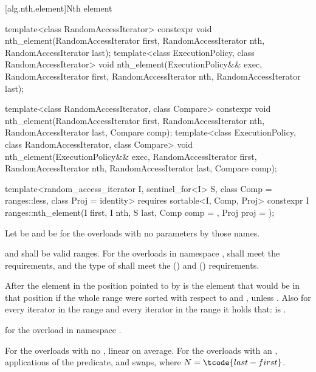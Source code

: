 [alg.nth.element]{Nth element}

%
\begin{itemdecl}
template<class RandomAccessIterator>
  constexpr void nth_element(RandomAccessIterator first, RandomAccessIterator nth,
                             RandomAccessIterator last);
template<class ExecutionPolicy, class RandomAccessIterator>
  void nth_element(ExecutionPolicy&& exec,
                   RandomAccessIterator first, RandomAccessIterator nth,
                   RandomAccessIterator last);

template<class RandomAccessIterator, class Compare>
  constexpr void nth_element(RandomAccessIterator first, RandomAccessIterator nth,
                             RandomAccessIterator last,  Compare comp);
template<class ExecutionPolicy, class RandomAccessIterator, class Compare>
  void nth_element(ExecutionPolicy&& exec,
                   RandomAccessIterator first, RandomAccessIterator nth,
                   RandomAccessIterator last, Compare comp);

template<random_access_iterator I, sentinel_for<I> S, class Comp = ranges::less,
         class Proj = identity>
  requires sortable<I, Comp, Proj>
  constexpr I
    ranges::nth_element(I first, I nth, S last, Comp comp = {}, Proj proj = {});
\end{itemdecl}

\begin{itemdescr}
\pnum
Let  be 
and  be 
for the overloads with no parameters by those names.

\pnum
\requires
{} and  shall be valid ranges.
For the overloads in namespace ,
 shall meet
the  requirements, and
the type of  shall meet
the  () and
 () requirements.

\pnum
\effects
After  the element in the position pointed to by 
is the element that would be in that position
if the whole range were sorted with respect to  and ,
unless .
Also for every iterator  in the range 
and every iterator  in the range 
it holds that:
 is .

\pnum
\returns
{} for the overload in namespace .

\pnum
\complexity
For the overloads with no , linear on average.
For the overloads with an ,  applications of
the predicate, and  swaps, where $N = \tcode{last - first}$.
\end{itemdescr}

